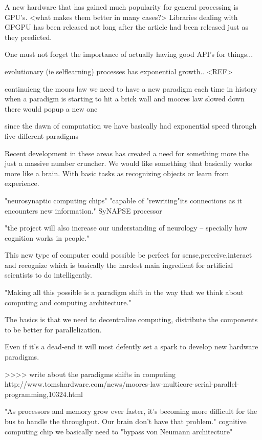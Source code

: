 \documentclass{article}
\begin{document}
    A new hardware that has gained much popularity for general processing is
    GPU's. <what makes them better in many cases?> 
    Libraries dealing with GPGPU has been released not long after the
    article\cite{ms2020} had been released just as they predicted.

    One must not forget the importance of actually having good API's for
    things...

evolutionary (ie selflearning) processes has exponential growth.. <REF>

continuieng the moors law we need to have a new paradigm
each time in history when a paradigm is starting to hit a brick wall and
moores law slowed down there would popup a new one

since the dawn of computation we have basically had exponential speed through
five different paradigms


Recent development in these areas has created a need for something more the
just a massive number cruncher. We would like something that basically works
more like a brain. With basic tasks as recognizing objects or learn from
experience.
\cite{synapse}

"neurosynaptic computing chips" 
"capable of "rewriting"its connections as it
encounters new information."
SyNAPSE processor

"the project will also increase our understanding of neurology -- specially how
cognition works in people."

This new type of computer could possible be perfect for sense,perceive,interact
and recognize which is basically the hardest main ingredient for artificial
scientists to do intelligently.

"Making all this possible is a paradigm shift in the way that we think about
computing and computing architecture."

The basics is that we need to decentralize computing, distribute the components
to be better for parallelization.

Even if it's a dead-end it will most defently set a spark to develop new
hardware paradigms.

>>>> write about the paradigms shifts in computing
http://www.tomshardware.com/news/moores-law-multicore-serial-parallel-programming,10324.html

"As processors and memory grow ever faster, it's becoming more difficult for
the bus to handle the throughput. Our brain don't have that problem."
cognitive computing chip
we basically need to "bypass von Neumann architecture"
\end{document}
